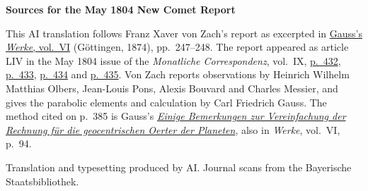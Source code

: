 \clearpage\thispagestyle{empty}
\begin{center}\textbf{Sources for the May 1804 New Comet Report}\end{center}
\noindent This AI translation follows Franz Xaver von Zach’s report as excerpted in \href{https://gdz.sub.uni-goettingen.de/id/PPN236007467}{Gauss’s \textit{Werke}, vol.~VI} (Göttingen, 1874), pp.~247--248. The report appeared as article LIV in the May 1804 issue of the \textit{Monatliche Correspondenz}, vol.~IX, \href{https://www.digitale-sammlungen.de/en/view/bsb10538601?page=468}{p.~432}, \href{https://www.digitale-sammlungen.de/en/view/bsb10538601?page=469}{p.~433}, \href{https://www.digitale-sammlungen.de/en/view/bsb10538601?page=470}{p.~434} and \href{https://www.digitale-sammlungen.de/en/view/bsb10538601?page=471}{p.~435}. Von Zach reports observations by Heinrich Wilhelm Matthias Olbers, Jean-Louis Pons, Alexis Bouvard and Charles Messier, and gives the parabolic elements and calculation by Carl Friedrich Gauss. The method cited on p.~385 is Gauss’s \href{https://www.digitale-sammlungen.de/en/view/bsb10538601?page=421}{\textit{Einige Bemerkungen zur Vereinfachung der Rechnung für die geocentrischen Oerter der Planeten}}, also in \textit{Werke}, vol.~VI, p.~94.
\par\smallskip\noindent Translation and typesetting produced by AI. Journal scans from the Bayerische Staatsbibliothek.
\clearpage
